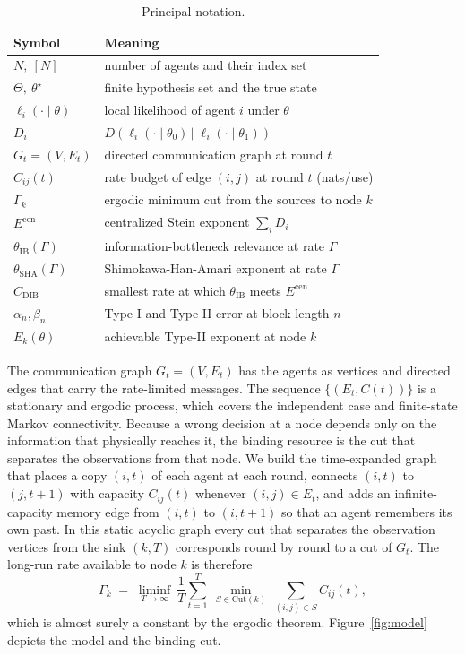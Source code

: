 \documentclass[journal]{IEEEtran}
\theoremstyle{definition}
\theoremstyle{remark}
\newcommand{\Ecen}{E^{\mathrm{cen}}}
\newcommand{\tib}{\theta_{\mathrm{IB}}}
\newcommand{\tsha}{\theta_{\mathrm{SHA}}}
\newcommand{\Gk}{\Gamma_k}
\newcommand{\Cdib}{C_{\mathrm{DIB}}}
\newcommand{\KL}[2]{D\!\left(#1\,\Vert\,#2\right)}
\begin{document}
\begin{table}[t]
\centering
\caption{Principal notation.}
\label{tab:notation}
\renewcommand{\arraystretch}{1.25}
\begin{tabular}{@{}ll@{}}
\toprule
Symbol & Meaning \\
\midrule
$N,\ [N]$ & number of agents and their index set \\
$\Theta,\ \theta^\star$ & finite hypothesis set and the true state \\
$\ell_i(\cdot\mid\theta)$ & local likelihood of agent $i$ under $\theta$ \\
$D_i$ & $\KL{\ell_i(\cdot\mid\theta_0)}{\ell_i(\cdot\mid\theta_1)}$ \\
$G_t=(V,E_t)$ & directed communication graph at round $t$ \\
$C_{ij}(t)$ & rate budget of edge $(i,j)$ at round $t$ (nats/use) \\
$\Gk$ & ergodic minimum cut from the sources to node $k$ \\
$\Ecen$ & centralized Stein exponent $\sum_i D_i$ \\
$\tib(\Gamma)$ & information-bottleneck relevance at rate $\Gamma$ \\
$\tsha(\Gamma)$ & Shimokawa-Han-Amari exponent at rate $\Gamma$ \\
$\Cdib$ & smallest rate at which $\tib$ meets $\Ecen$ \\
$\alpha_n,\beta_n$ & Type-I and Type-II error at block length $n$ \\
$E_k(\theta)$ & achievable Type-II exponent at node $k$ \\
\bottomrule
\end{tabular}
\end{table}

The communication graph $G_t=(V,E_t)$ has the agents as vertices and directed edges that carry the rate-limited
messages. The sequence $\{(E_t,C(t))\}$ is a stationary and ergodic process, which covers the independent case and
finite-state Markov connectivity. Because a wrong decision at a node depends only on the information that
physically reaches it, the binding resource is the cut that separates the observations from that node. We build
the time-expanded graph that places a copy $(i,t)$ of each agent at each round, connects $(i,t)$ to $(j,t+1)$ with
capacity $C_{ij}(t)$ whenever $(i,j)\in E_t$, and adds an infinite-capacity memory edge from $(i,t)$ to $(i,t+1)$
so that an agent remembers its own past. In this static acyclic graph every cut that separates the observation
vertices from the sink $(k,T)$ corresponds round by round to a cut of $G_t$. The long-run rate available to node
$k$ is therefore
\begin{equation}
\Gk \;=\; \liminf_{T\to\infty}\ \frac1T\sum_{t=1}^{T}\ \min_{S\in\mathrm{Cut}(k)}\ \sum_{(i,j)\in S} C_{ij}(t),
\label{eq:gammak}
\end{equation}
which is almost surely a constant by the ergodic theorem. Figure~\ref{fig:model} depicts the model and the
binding cut.
\end{document}
